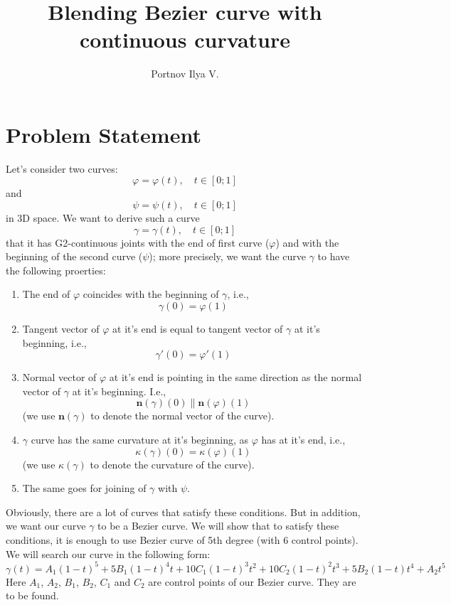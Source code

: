 \documentclass[12pt,a4paper]{article}
\author{Portnov Ilya V.}
\title{Blending Bezier curve with continuous curvature}
\begin{document}
\maketitle

\section{Problem Statement}

Let's consider two curves:
$$
\varphi = \varphi(t),\quad t\in[0;1]
$$
and
$$
\psi = \psi(t),\quad t\in[0;1]
$$
in 3D space. We want to derive such a curve
$$
\gamma = \gamma(t), \quad t\in[0;1]
$$
that it has G2-continuous joints with the end of first curve ($\varphi$) and with the beginning of the second curve ($\psi$); more precisely, we want the curve $\gamma$ to have the following proerties:
\begin{enumerate}
  \item The end of $\varphi$ coincides with the beginning of $\gamma$, i.e.,
    \begin{equation}\label{C0}
    \gamma(0) = \varphi(1)
    \end{equation}
  \item Tangent vector of $\varphi$ at it's end is equal to tangent vector of $\gamma$ at it's beginning, i.e.,
    \begin{equation}\label{C1}
    \gamma'(0) = \varphi'(1)
    \end{equation}
  \item Normal vector of $\varphi$ at it's end is pointing in the same direction as the normal vector of $\gamma$ at it's beginning. I.e.,
    \begin{equation}\label{normal}
    \mathbf{n}(\gamma)(0) \parallel \mathbf{n}(\varphi)(1)
    \end{equation}
    (we use $\mathbf{n}(\gamma)$ to denote the normal vector of the curve).
  \item $\gamma$ curve has the same curvature at it's beginning, as $\varphi$ has at it's end, i.e.,
    \begin{equation}\label{curvature}
    \kappa(\gamma)(0) = \kappa(\varphi)(1)
    \end{equation}
    (we use $\kappa(\gamma)$ to denote the curvature of the curve).
  \item The same goes for joining of $\gamma$ with $\psi$.
\end{enumerate}

Obviously, there are a lot of curves that satisfy these conditions. But in addition, we want our curve $\gamma$ to be a Bezier curve. We will show that to satisfy these conditions, it is enough to use Bezier curve of 5th degree (with 6 control points). We will search our curve in the following form:
\begin{equation}\label{bezier}
\gamma(t) = A_1(1-t)^5 + 5B_1(1-t)^4t + 10C_1(1-t)^3t^2 + 10C_2(1-t)^2t^3 + 5B_2(1-t)t^4 + A_2t^5
\end{equation}
Here $A_1$, $A_2$, $B_1$, $B_2$, $C_1$ and $C_2$ are control points of our Bezier curve. They are to be found.
\end{document}
